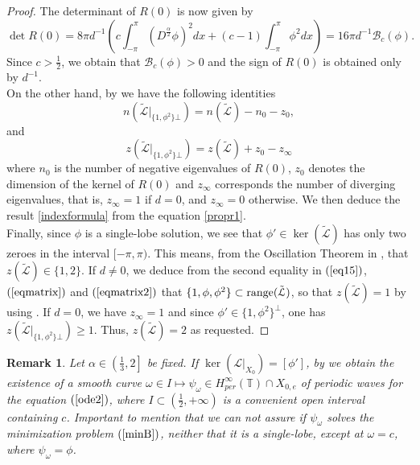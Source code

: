 \documentclass[12pt,reqno]{amsart}
\newcommand{\2}{L^2_{per}(0, T)}
\newtheorem{obs}{Remark}[section]
\numberwithin{equation}{section}
\numberwithin{figure}{section}
\begin{document}
\begin{proof}
	The determinant of $R(0)$  is now given by
	\begin{equation}\label{detM}
	\displaystyle \det R(0) = 8\pi d^{-1} \left( c \int_{-\pi}^{\pi} (D^{\frac{\alpha}{2}}\phi)^2 dx  + (c-1)\int_{-\pi}^{\pi}\phi^2dx\right)=16\pi d^{-1}\mathcal{B}_c(\phi).
	\end{equation}
	Since $c>\frac{1}{2}$, we obtain that $\mathcal{B}_c(\phi)>0$ and the sign of $R(0)$ is obtained only by $d^{-1}$.\\
	\indent On the other hand, by \cite[Theorem 4.1]{pel-book} we have the following identities
	\begin{equation}\label{indexformula}
	n(\mathcal{{\tilde{L}}}|_{\{1,\phi^2\}\bot}) = n(\mathcal{\tilde{L}}) - n_0 - z_0,
	\end{equation}
	and
	\begin{equation}\label{indexformula1}
	z(\mathcal{{\tilde{L}}}|_{\{1,\phi^2\}\bot}) = z(\mathcal{\tilde{L}}) +z_0-z_{\infty}
	\end{equation}
	where $n_0$ is the number of negative eigenvalues of $R(0)$, $z_0$ denotes the dimension of the kernel of $R(0)$ and $z_{\infty}$ corresponds the number of diverging eigenvalues, that is, $z_{\infty}=1$ if $d=0$, and $z_{\infty}=0$ otherwise. We then deduce the result \eqref{indexformula} from the equation \eqref{propr1}. \\
	\indent Finally, since $\phi$ is a single-lobe solution, we see that $\phi'\in \ker(\tilde{\mathcal{L}})$ has only two zeroes in the interval $[-\pi,\pi)$. This means, from the Oscillation Theorem in \cite{hur}, that $z(\tilde{\mathcal{L}})\in \{1,2\}$. If $d\neq 0$, we deduce from the second equality in $(\ref{eq15})$, $(\ref{eqmatrix})$ and $(\ref{eqmatrix2})$ that $\{1,\phi,\phi^2\}\subset{\rm range}(\tilde{\mathcal{L}})$, so that $z(\tilde{\mathcal{L}})=1$ by using \cite[Proposition 3.1]{hur}. If $d=0$, we have $z_{\infty}=1$ and since $\phi'\in\{1,\phi^2\}^{\bot}$, one has $z(\mathcal{{\tilde{L}}}|_{\{1,\phi^2\}\bot})\geq1$. Thus, $z(\tilde{\mathcal{L}})=2$ as requested.
\end{proof}

\begin{obs}\label{obs25}
	Let $\alpha\in\left(\frac{1}{3},2\right]$ be fixed. If $\ker(\mathcal{L}|_{X_0})=[\phi']$, by \cite[Lemma 3.8]{NPL} we obtain the existence of a smooth curve $\omega\in I\mapsto \psi_{\omega}\in H_{per}^{\infty}(\mathbb{T})\cap X_{0,e}$ of periodic waves for the equation $(\ref{ode2})$, where $I\subset(\frac{1}{2},+\infty)$ is a convenient open interval containing $c$. Important to mention that we can not assure if $\psi_{\omega}$ solves the minimization problem $(\ref{minB})$, neither that it is a single-lobe, except at $\omega=c$, where $\psi_{\omega}=\phi$.
\end{obs}
\end{document}
